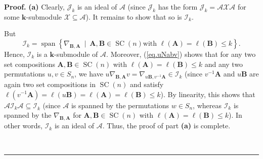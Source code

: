 \documentclass[numbers=enddot,12pt,final,onecolumn,notitlepage]{scrartcl}%
\numberwithin{exer}{subsection}
\theoremstyle{definition}
\newenvironment{proof}[1][Proof]{\noindent\textbf{#1.} }{\ \rule{0.5em}{0.5em}}
\begin{document}
\begin{proof}
\textbf{(a)} Clearly, $\mathcal{J}_{k}$ is an ideal of $\mathcal{A}$ (since
$\mathcal{J}_{k}$ has the form $\mathcal{J}_{k}=\mathcal{AXA}$ for some
$\mathbf{k}$-submodule $\mathcal{X}\subseteq\mathcal{A}$). It remains to show
that so is $\mathcal{I}_{k}$.

But
\[
\mathcal{I}_{k}=\operatorname*{span}\left\{  \nabla_{\mathbf{B},\mathbf{A}%
}\ \mid\ \mathbf{A},\mathbf{B}\in\operatorname*{SC}\left(  n\right)  \text{
with }\ell\left(  \mathbf{A}\right)  =\ell\left(  \mathbf{B}\right)  \leq
k\right\}  .
\]
Hence, $\mathcal{I}_{k}$ is a $\mathbf{k}$-submodule of $\mathcal{A}$.
Moreover, (\ref{eq.uNabv}) shows that for any two set compositions
$\mathbf{A},\mathbf{B}\in\operatorname*{SC}\left(  n\right)  $ with
$\ell\left(  \mathbf{A}\right)  =\ell\left(  \mathbf{B}\right)  \leq k$ and
any two permutations $u,v\in S_{n}$, we have $u\nabla_{\mathbf{B},\mathbf{A}%
}v=\nabla_{u\mathbf{B},v^{-1}\mathbf{A}}\in\mathcal{I}_{k}$ (since
$v^{-1}\mathbf{A}$ and $u\mathbf{B}$ are again two set compositions in
$\operatorname*{SC}\left(  n\right)  $ and satisfy $\ell\left(  v^{-1}%
\mathbf{A}\right)  =\ell\left(  u\mathbf{B}\right)  =\ell\left(
\mathbf{A}\right)  =\ell\left(  \mathbf{B}\right)  \leq k$). By linearity,
this shows that $\mathcal{AI}_{k}\mathcal{A\subseteq I}_{k}$ (since
$\mathcal{A}$ is spanned by the permutations $w\in S_{n}$, whereas
$\mathcal{I}_{k}$ is spanned by the $\nabla_{\mathbf{B},\mathbf{A}}$ for
$\mathbf{A},\mathbf{B}\in\operatorname*{SC}\left(  n\right)  $ with
$\ell\left(  \mathbf{A}\right)  =\ell\left(  \mathbf{B}\right)  \leq k$). In
other words, $\mathcal{I}_{k}$ is an ideal of $\mathcal{A}$. Thus, the proof
of part \textbf{(a)} is complete. \medskip


\end{proof}
\end{document}
